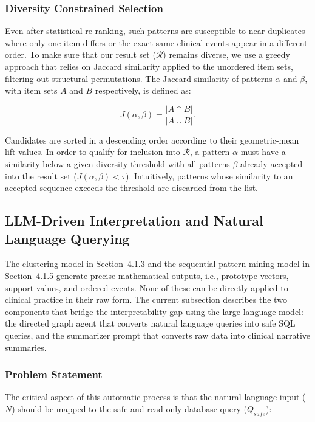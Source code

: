 \subsubsection*{Diversity Constrained Selection}

Even after statistical re-ranking, such patterns are susceptible to near-duplicates where only one item differs or the exact same clinical events appear in a different order. To make sure that our result set ($\mathcal{R}$) remains diverse, we use a greedy approach that relies on Jaccard similarity applied to the unordered item sets, filtering out structural permutations. The Jaccard similarity of patterns $\alpha$ and $\beta$, with item sets $A$ and $B$ respectively, is defined as:

\begin{equation}
    J(\alpha, \beta) = \frac{|A \cap B|}{|A \cup B|}.
    \label{eq:jaccard}
\end{equation}

Candidates are sorted in a descending order according to their geometric-mean lift values. In order to qualify for inclusion into $\mathcal{R}$, a pattern $\alpha$ must have a similarity below a given diversity threshold with all patterns $\beta$ already accepted into the result set ($J(\alpha, \beta) < \tau$). Intuitively, patterns whose similarity to an accepted sequence exceeds the threshold are discarded from the list.
\subsection{LLM-Driven Interpretation and Natural Language Querying}

The clustering model in Section~4.1.3 and the sequential pattern mining model in Section~4.1.5 generate precise mathematical outputs, i.e., prototype vectors, support values, and ordered events. None of these can be directly applied to clinical practice in their raw form. The current subsection describes the two components that bridge the interpretability gap using the large language model: the directed graph agent that converts natural language queries into safe SQL queries, and the summarizer prompt that converts raw data into clinical narrative summaries.

\subsubsection*{Problem Statement}

The critical aspect of this automatic process is that the natural language input ($N$) should be mapped to the safe and read-only database query ($Q_{safe}$):

